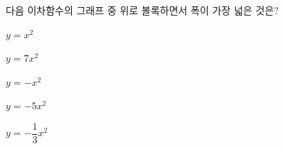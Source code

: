 다음 이차함수의 그래프 중 위로 볼록하면서 폭이 가장 넓은 것은?
\begin{choices32}{\rule[-3ex]{0pt}{8ex}$y=x^2$}{\rule[-3ex]{0pt}{8ex}$y=7x^2$}{\rule[-3ex]{0pt}{8ex}$y=-x^2$}{\rule[-3ex]{0pt}{8ex}$y=-5x^2$}{\rule[-3ex]{0pt}{8ex}$y=-\dfrac{1}{3}x^2$}\end{choices32}
